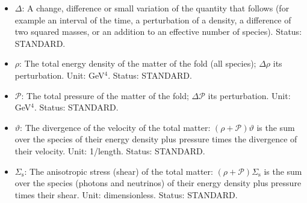 \documentclass[
  10pt,
]{article}
\begin{document}
\begin{itemize}
  Value: \(6.708\times10^{-39}\) GeV\(^{-2}\). Status: STANDARD.
\item
  \(\Delta\): A change, difference or small variation of the quantity
  that follows (for example an interval of the time, a perturbation of a
  density, a difference of two squared masses, or an addition to an
  effective number of species). Status: STANDARD.
\item
  \(\rho\): The total energy density of the matter of the fold (all
  species); \(\Delta\rho\) its perturbation. Unit: GeV\(^4\). Status:
  STANDARD.
\item
  \(\mathcal{P}\): The total pressure of the matter of the fold;
  \(\Delta\mathcal{P}\) its perturbation. Unit: GeV\(^4\). Status:
  STANDARD.
\item
  \(\vartheta\): The divergence of the velocity of the total matter:
  \((\rho + \mathcal{P})\vartheta\) is the sum over the species of their
  energy density plus pressure times the divergence of their velocity.
  Unit: 1/length. Status: STANDARD.
\item
  \(\Sigma_{\mathrm{s}}\): The anisotropic stress (shear) of the total
  matter: \((\rho + \mathcal{P})\Sigma_{\mathrm{s}}\) is the sum over
  the species (photons and neutrinos) of their energy density plus
  pressure times their shear. Unit: dimensionless. Status: STANDARD.
\end{itemize}
\end{document}

